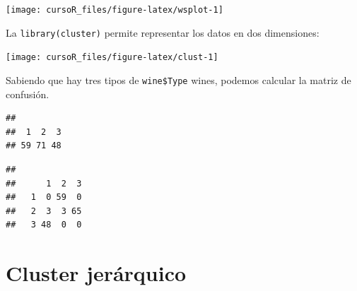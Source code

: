 \documentclass[]{book}
\newenvironment{Shaded}{\begin{snugshade}}{\end{snugshade}}
\newcommand{\KeywordTok}[1]{\textcolor[rgb]{0.13,0.29,0.53}{\textbf{#1}}}
\newcommand{\DataTypeTok}[1]{\textcolor[rgb]{0.13,0.29,0.53}{#1}}
\newcommand{\DecValTok}[1]{\textcolor[rgb]{0.00,0.00,0.81}{#1}}
\newcommand{\StringTok}[1]{\textcolor[rgb]{0.31,0.60,0.02}{#1}}
\newcommand{\OtherTok}[1]{\textcolor[rgb]{0.56,0.35,0.01}{#1}}
\newcommand{\OperatorTok}[1]{\textcolor[rgb]{0.81,0.36,0.00}{\textbf{#1}}}
\newcommand{\NormalTok}[1]{#1}
\begin{document}
\begin{center}\texttt{[image: cursoR\_files/figure-latex/wsplot-1]} \end{center}

La \texttt{library(cluster)} permite representar los datos en dos
dimensiones:

\begin{Shaded}
\end{Shaded}

\begin{center}\texttt{[image: cursoR\_files/figure-latex/clust-1]} \end{center}

Sabiendo que hay tres tipos de \texttt{wine\$Type} wines, podemos
calcular la matriz de confusión.

\begin{Shaded}
\end{Shaded}

\begin{verbatim}
## 
##  1  2  3 
## 59 71 48
\end{verbatim}

\begin{Shaded}
\end{Shaded}

\begin{verbatim}
##    
##      1  2  3
##   1  0 59  0
##   2  3  3 65
##   3 48  0  0
\end{verbatim}

\section{Cluster jerárquico}\label{cluster-jeruxe1rquico}
\end{document}
